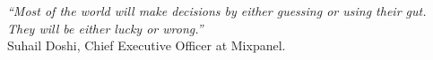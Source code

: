 \cleardoublepage
\thispagestyle{plain}

\vspace*{8cm}

\begin{flushright}
  \textsl{``Most of the world will make decisions by either guessing or using their gut.\\They will be either lucky or wrong.''}\\
\vspace*{1.5cm}
    Suhail Doshi, Chief Executive Officer at Mixpanel.
\end{flushright}





